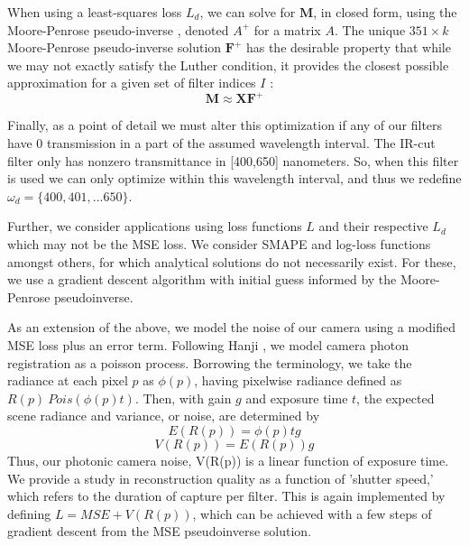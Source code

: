 When using a least-squares loss $L_d$, we can solve for $\boldsymbol{M}$, in closed form, using the Moore-Penrose pseudo-inverse \cite{greville1960some, BEUTLER1965451}, denoted $A^+$ for a matrix $A$. 
The unique $351 \times k$ Moore-Penrose pseudo-inverse solution $\boldsymbol{F}^+$ has the desirable property that while we may not exactly satisfy the Luther condition, it provides the closest possible approximation for a given set of filter indices $I$ \cite{macausland2014moore}:
\begin{equation}
    \boldsymbol{M} \approx \boldsymbol{X}\boldsymbol{F}^+
\end{equation} 

Finally, as a point of detail we must alter this optimization if any of our filters have 0 transmission in a part of the assumed wavelength interval. 
The IR-cut filter only has nonzero transmittance in [400,650] nanometers. 
So, when this filter is used we can only optimize within this wavelength interval, and thus we redefine $\omega_d = \{400,401,...650\}$.%

Further, we consider applications using loss functions $L$ and their respective $L_d$ which may not be the MSE loss. 
We consider SMAPE and log-loss functions amongst others, for which analytical solutions do not necessarily exist. 
For these, we use a gradient descent algorithm with initial guess informed by the Moore-Penrose pseudoinverse.

As an extension of the above, we model the noise of our camera using a modified MSE loss plus an error term. 
Following Hanji \cite{hanji2020noise}, we model camera photon registration as a poisson process. 
Borrowing the terminology, we take the radiance at each pixel $p$ as $\phi(p)$, having pixelwise radiance defined as $R(p)~Pois(\phi(p)t)$.
Then, with gain $g$ and exposure time $t$, the expected scene radiance and variance, or noise, are determined by
\begin{equation}
    E(R(p)) = \phi(p)tg 
\end{equation} 
\begin{equation}
    V(R(p)) = E(R(p))g 
\end{equation} 
Thus, our photonic camera noise, V(R(p)) is a linear function of exposure time. 
We provide a study in reconstruction quality as a function of 'shutter speed,' which refers to the duration of capture per filter. 
This is again implemented by defining $L = MSE + V(R(p))$, which can be achieved with a few steps of gradient descent from the MSE pseudoinverse solution. 

